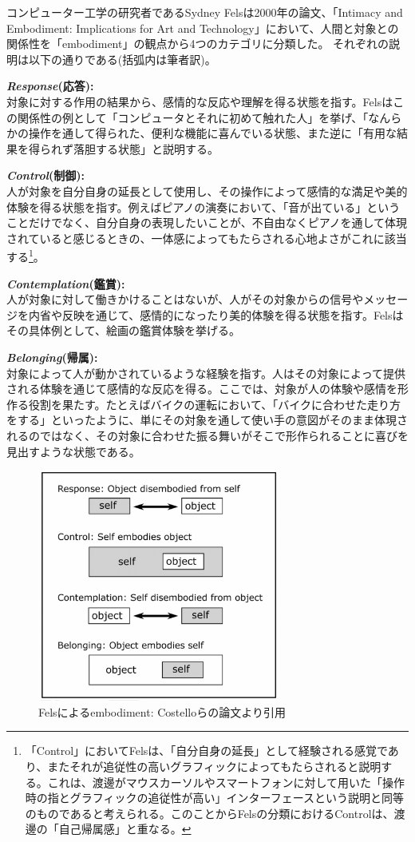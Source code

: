 コンピューター工学の研究者であるSydney Felsは2000年の論文、「Intimacy and Embodiment: Implications for Art and Technology」\cite{Fels}において、人間と対象との関係性を「embodiment」の観点から4つのカテゴリに分類した。
それぞれの説明は以下の通りである(括弧内は筆者訳)。

\textbf{\textit{Response}(応答):}\\
対象に対する作用の結果から、感情的な反応や理解を得る状態を指す。Felsはこの関係性の例として「コンピュータとそれに初めて触れた人」を挙げ、「なんらかの操作を通して得られた、便利な機能に喜んでいる状態、また逆に「有用な結果を得られず落胆する状態」と説明する。

\textbf{\textit{Control}(制御):}\\
人が対象を自分自身の延長として使用し、その操作によって感情的な満足や美的体験を得る状態を指す。例えばピアノの演奏において、「音が出ている」ということだけでなく、自分自身の表現したいことが、不自由なくピアノを通して体現されていると感じるときの、一体感によってもたらされる心地よさがこれに該当する\footnote{「Control」においてFelsは、「自分自身の延長」として経験される感覚であり、またそれが追従性の高いグラフィックによってもたらされると説明する。これは、渡邊がマウスカーソルやスマートフォンに対して用いた「操作時の指とグラフィックの追従性が高い」インターフェースという説明と同等のものであると考えられる。このことからFelsの分類におけるControlは、渡邊の「自己帰属感」と重なる。}。

\textbf{\textit{Contemplation}(鑑賞):}\\
人が対象に対して働きかけることはないが、人がその対象からの信号やメッセージを内省や反映を通じて、感情的になったり美的体験を得る状態を指す。Felsはその具体例として、絵画の鑑賞体験を挙げる。

\textbf{\textit{Belonging}(帰属):}\\
対象によって人が動かされているような経験を指す。人はその対象によって提供される体験を通じて感情的な反応を得る。ここでは、対象が人の体験や感情を形作る役割を果たす。たとえばバイクの運転において、「バイクに合わせた走り方をする」といったように、単にその対象を通して使い手の意図がそのまま体現されるのではなく、その対象に合わせた振る舞いがそこで形作られることに喜びを見出すような状態である。

\begin{figure}[H]
  \centering
  \includegraphics[width=8cm]{img/fels_diagram.png}
  \caption{Felsによるembodiment: Costelloらの論文\cite{Costello2005}より引用}
  \label{fig:fels_embodiment}
\end{figure}

